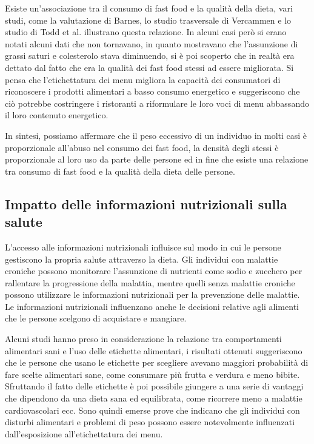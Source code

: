 Esiste un'associazione tra il consumo di fast food e la qualità della dieta, vari studi, come la valutazione di Barnes, lo studio trasversale di Vercammen e lo studio di Todd et al. illustrano questa relazione.
In alcuni casi però si erano notati alcuni dati che non tornavano, in quanto mostravano che l'assunzione di grassi saturi e colesterolo stava diminuendo, si è poi scoperto che in realtà era dettato dal fatto che era la qualità dei fast food stessi ad essere migliorata.
Si pensa che l'etichettatura dei menu migliora la capacità dei consumatori di riconoscere i prodotti alimentari a basso consumo energetico e suggeriscono che ciò potrebbe costringere i ristoranti a riformulare le loro voci di menu abbassando il loro contenuto energetico.

In sintesi, possiamo affermare che il peso eccessivo di un individuo in molti casi è proporzionale all'abuso nel consumo dei fast food, la densità degli stessi è proporzionale al loro uso da parte delle persone ed in fine che esiste una relazione tra consumo di fast food e la qualità della dieta delle persone.

\subsection{Impatto delle informazioni nutrizionali sulla salute}
L'accesso alle informazioni nutrizionali influisce sul modo in cui le persone gestiscono la propria salute attraverso la dieta. Gli individui con malattie croniche possono monitorare l'assunzione di nutrienti come sodio e zucchero per rallentare la progressione della malattia, mentre quelli senza malattie croniche possono utilizzare le informazioni nutrizionali per la prevenzione delle malattie. Le informazioni nutrizionali influenzano anche le decisioni relative agli alimenti che le persone scelgono di acquistare e mangiare.

Alcuni studi hanno preso in considerazione la relazione tra comportamenti alimentari sani e l'uso delle etichette alimentari, i risultati ottenuti suggeriscono che le persone che usano le etichette per scegliere avevano maggiori probabilità di fare scelte alimentari sane, come consumare più frutta e verdura e meno bibite. Sfruttando il fatto delle etichette è poi possibile giungere a una serie di vantaggi che dipendono da una dieta sana ed equilibrata, come ricorrere meno a malattie cardiovascolari ecc.
Sono quindi emerse prove che indicano che gli individui con disturbi alimentari e problemi di peso possono essere notevolmente influenzati dall'esposizione all'etichettatura dei menu.
